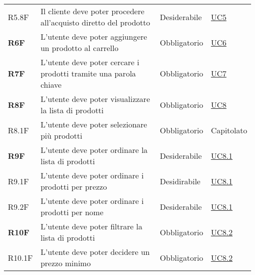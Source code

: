 \begin{center}
\begin{longtable}[!h]{p{50px} p{245px} p{75px} p{50px}}
        R5.8F                                 & Il cliente deve poter procedere all'acquisto diretto del prodotto                                          & Desiderabile             & \hyperref[sec:UC5]{UC5}                      \\
        \textbf{R6F}                          & L'utente deve poter aggiungere un prodotto al carrello                                                     & Obbligatorio             & \hyperref[sec:UC6]{UC6}                      \\
        \textbf{R7F}                          & L'utente deve poter cercare i prodotti tramite una parola chiave                                           & Obbligatorio             & \hyperref[sec:UC7]{UC7}                      \\
        \textbf{R8F}                          & L'utente deve poter visualizzare la lista di prodotti                                                      & Obbligatorio             & \hyperref[sec:UC8]{UC8}                      \\
        R8.1F                                 & L'utente deve poter selezionare più prodotti                                                               & Obbligatorio             & Capitolato                                   \\
        \textbf{R9F}                          & L'utente deve poter ordinare la lista di prodotti                                                          & Desiderabile             & \hyperref[sec:UC8.1]{UC8.1}                  \\
        R9.1F                                 & L'utente deve poter ordinare i prodotti per prezzo                                                         & Desidirabile             & \hyperref[sec:UC8.1]{UC8.1}                  \\
        R9.2F                                 & L'utente deve poter ordinare i prodotti per nome                                                           & Desiderabile             & \hyperref[sec:UC8.1]{UC8.1}                  \\
        \textbf{R10F}                         & L'utente deve poter filtrare la lista di prodotti                                                          & Obbligatorio             & \hyperref[sec:UC8.2]{UC8.2}                  \\
        R10.1F                                & L'utente deve poter decidere un prezzo minimo                                                              & Obbligatorio             & \hyperref[sec:UC8.2]{UC8.2}                  \\

\end{longtable}
\end{center}
